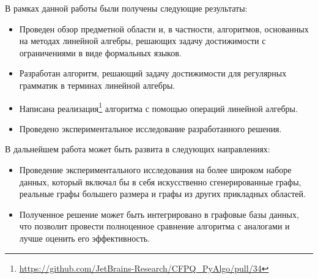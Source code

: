 


В рамках данной работы были получены следующие результаты:

\begin{itemize}
\item Проведен обзор предметной области и, в частности, алгоритмов, основанных на методах линейной алгебры, решающих задачу достижимости с ограничениями в виде формальных языков.
\item Разработан алгоритм, решающий задачу достижимости для регулярных грамматик в терминах линейной алгебры.
\item Написана реализация\footnote{\href{https://github.com/JetBrains-Research/CFPQ_PyAlgo/pull/34}{https://github.com/JetBrains-Research/CFPQ\_PyAlgo/pull/34}} алгоритма с помощью операций линейной алгебры.

\item Проведено экспериментальное исследование разработанного решения.

\end{itemize}

В дальнейшем работа может быть развита в следующих направлениях:

\begin{itemize}
    \item Проведение экспериментального исследования на более широком наборе данных, который включал бы в себя искусственно сгенерированные графы, реальные графы большего размера и графы из других прикладных областей.
    \item Полученное решение может быть интегрировано в графовые базы данных, что позволит провести полноценное сравнение алгоритма с аналогами и лучше оценить его эффективность. 
\end{itemize}
